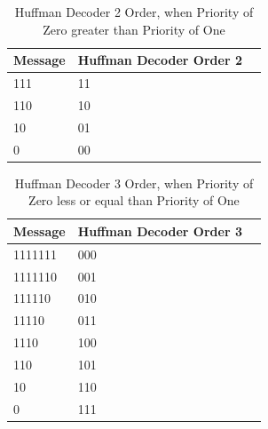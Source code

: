 \begin{refsection}
\begin{table}[H]
\begin{tabular}{|l|l|l|}
\end{tabular}
\end{table}

\begin{table}[H]
\centering
\caption{Huffman Decoder 2 Order, when Priority of Zero greater than Priority of One}
\label{tb:hufmmandecoder3}
\begin{tabular}{|l|l|l|}
\hline
\textbf{Message}                      & \textbf{Huffman Decoder Order 2}                                       \\ \hline
111         &11                                                          \\ \hline
110         &10                                                        \\ \hline
10           &01                                               \\ \hline
0             &00                                       \\ \hline

\end{tabular}
\end{table}


\begin{table}[H]
\centering
\caption{Huffman Decoder 3 Order, when Priority of Zero less or equal than Priority of One}
\label{tb:hufmmandecoder4}
\begin{tabular}{|l|l|l|}
\hline
\textbf{Message}                      & \textbf{Huffman Decoder Order 3}                                       \\ \hline
1111111    & 000                                                      \\ \hline
1111110    & 001                                                     \\ \hline
111110      & 010                                                   \\ \hline
11110        & 011                                          \\ \hline
1110          & 100                                               \\ \hline
110            & 101                                             \\ \hline
10              & 110                                          \\ \hline
0                & 111                                         \\ \hline
\end{tabular}
\end{table}


\end{refsection}
